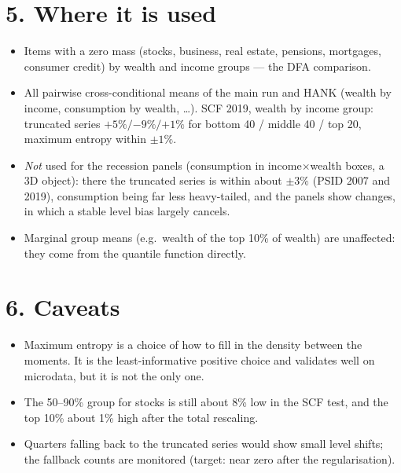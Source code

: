 \documentclass[11pt]{article}
\begin{document}
\section*{5. Where it is used}
\begin{itemize}
\item Items with a zero mass (stocks, business, real estate, pensions, mortgages, consumer credit) by wealth and income groups --- the DFA comparison.
\item All pairwise cross-conditional means of the main run and HANK (wealth by income, consumption by wealth, \dots). SCF 2019, wealth by income group: truncated series $+5\%/{-9\%}/{+1\%}$ for bottom 40 / middle 40 / top 20, maximum entropy within $\pm1\%$.
\item \emph{Not} used for the recession panels (consumption in income$\times$wealth boxes, a 3D object): there the truncated series is within about $\pm3\%$ (PSID 2007 and 2019), consumption being far less heavy-tailed, and the panels show changes, in which a stable level bias largely cancels.
\item Marginal group means (e.g.\ wealth of the top 10\% of wealth) are unaffected: they come from the quantile function directly.
\end{itemize}

\section*{6. Caveats}
\begin{itemize}
\item Maximum entropy is a choice of how to fill in the density between the moments. It is the least-informative positive choice and validates well on microdata, but it is not the only one.
\item The 50--90\% group for stocks is still about 8\% low in the SCF test, and the top 10\% about 1\% high after the total rescaling.
\item Quarters falling back to the truncated series would show small level shifts; the fallback counts are monitored (target: near zero after the regularisation).
\end{itemize}
\end{document}
